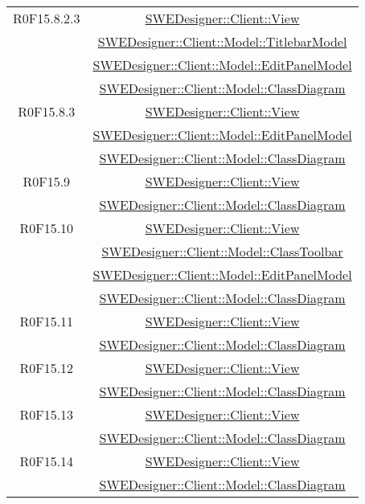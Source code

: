 \documentclass[../SpecificaTecnica.tex]{subfiles}
\begin{document}
\begin{longtable}{|c|c|}
		R0F15.8.2.3 & \hyperlink{SWEDesigner::Client::View}{SWEDesigner::Client::View}\\& \hyperlink{SWEDesigner::Client::Model::TitlebarModel}{SWEDesigner::Client::Model::TitlebarModel}\\& \hyperlink{SWEDesigner::Client::Model::EditPanelModel}{SWEDesigner::Client::Model::EditPanelModel}\\& \hyperlink{SWEDesigner::Client::Model::ClassDiagram}{SWEDesigner::Client::Model::ClassDiagram}\\\hline
		R0F15.8.3 & \hyperlink{SWEDesigner::Client::View}{SWEDesigner::Client::View}\\& \hyperlink{SWEDesigner::Client::Model::EditPanelModel}{SWEDesigner::Client::Model::EditPanelModel}\\& \hyperlink{SWEDesigner::Client::Model::ClassDiagram}{SWEDesigner::Client::Model::ClassDiagram}\\\hline
		R0F15.9 & \hyperlink{SWEDesigner::Client::View}{SWEDesigner::Client::View}\\& \hyperlink{SWEDesigner::Client::Model::ClassDiagram}{SWEDesigner::Client::Model::ClassDiagram}\\\hline
		R0F15.10 & \hyperlink{SWEDesigner::Client::View}{SWEDesigner::Client::View}\\& \hyperlink{SWEDesigner::Client::Model::ClassToolbar}{SWEDesigner::Client::Model::ClassToolbar}\\& \hyperlink{SWEDesigner::Client::Model::EditPanelModel}{SWEDesigner::Client::Model::EditPanelModel}\\& \hyperlink{SWEDesigner::Client::Model::ClassDiagram}{SWEDesigner::Client::Model::ClassDiagram}\\\hline
		R0F15.11 & \hyperlink{SWEDesigner::Client::View}{SWEDesigner::Client::View}\\& \hyperlink{SWEDesigner::Client::Model::ClassDiagram}{SWEDesigner::Client::Model::ClassDiagram}\\\hline
		R0F15.12 & \hyperlink{SWEDesigner::Client::View}{SWEDesigner::Client::View}\\& \hyperlink{SWEDesigner::Client::Model::ClassDiagram}{SWEDesigner::Client::Model::ClassDiagram}\\\hline
		R0F15.13 & \hyperlink{SWEDesigner::Client::View}{SWEDesigner::Client::View}\\& \hyperlink{SWEDesigner::Client::Model::ClassDiagram}{SWEDesigner::Client::Model::ClassDiagram}\\\hline
		R0F15.14 & \hyperlink{SWEDesigner::Client::View}{SWEDesigner::Client::View}\\& \hyperlink{SWEDesigner::Client::Model::ClassDiagram}{SWEDesigner::Client::Model::ClassDiagram}\\\hline

\end{longtable}
\end{document}

